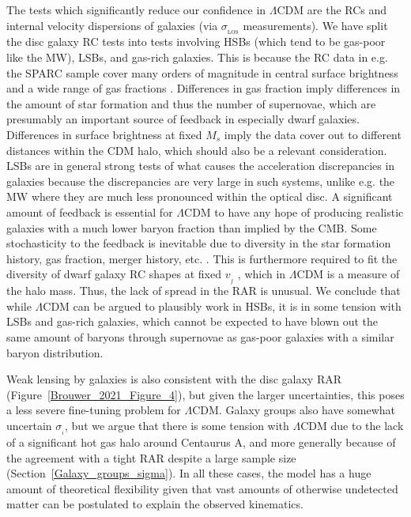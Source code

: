 \documentclass[fleqn,usenatbib,useAMS,onecolumn]{mnras} %
\begin{document}
The tests which significantly reduce our confidence in $\Lambda$CDM are the RCs and internal velocity dispersions of galaxies (via $\sigma_{_\text{LOS}}$ measurements). We have split the disc galaxy RC tests into tests involving HSBs (which tend to be gas-poor like the MW), LSBs, and gas-rich galaxies. This is because the RC data in e.g. the SPARC sample cover many orders of magnitude in central surface brightness and a wide range of gas fractions \citep{SPARC}. Differences in gas fraction imply differences in the amount of star formation and thus the number of supernovae, which are presumably an important source of feedback in especially dwarf galaxies. Differences in surface brightness at fixed $M_s$ imply the data cover out to different distances within the CDM halo, which should also be a relevant consideration. LSBs are in general strong tests of what causes the acceleration discrepancies in galaxies because the discrepancies are very large in such systems, unlike e.g. the MW where they are much less pronounced within the optical disc. A significant amount of feedback is essential for $\Lambda$CDM to have any hope of producing realistic galaxies with a much lower baryon fraction than implied by the CMB. Some stochasticity to the feedback is inevitable due to diversity in the star formation history, gas fraction, merger history, etc. \citep{Desmond_2017a, Desmond_2017b}. This is furthermore required to fit the diversity of dwarf galaxy RC shapes at fixed $v_{_f}$ \citep{Oman_2015}, which in $\Lambda$CDM is a measure of the halo mass. Thus, the lack of spread in the RAR is unusual. We conclude that while $\Lambda$CDM can be argued to plausibly work in HSBs, it is in some tension with LSBs and gas-rich galaxies, which cannot be expected to have blown out the same amount of baryons through supernovae as gas-poor galaxies with a similar baryon distribution.

Weak lensing by galaxies is also consistent with the disc galaxy RAR (Figure~\ref{Brouwer_2021_Figure_4}), but given the larger uncertainties, this poses a less severe fine-tuning problem for $\Lambda$CDM. Galaxy groups also have somewhat uncertain $\sigma_{_i}$, but we argue that there is some tension with $\Lambda$CDM due to the lack of a significant hot gas halo around Centaurus A, and more generally because of the agreement with a tight RAR despite a large sample size (Section~\ref{Galaxy_groups_sigma}). In all these cases, the model has a huge amount of theoretical flexibility given that vast amounts of otherwise undetected matter can be postulated to explain the observed kinematics.
\end{document}
